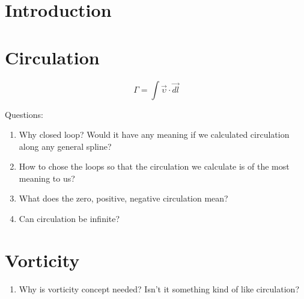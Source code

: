 \documentclass[12pt]{article}
\begin{document}

\setlength{\parindent}{0cm}

\clearpage


\tableofcontents



\setlength{\parskip}{1em}
\renewcommand{\baselinestretch}{1.0}


\newpage


\section{Introduction} \label{chap:intro}



\section{Circulation}

\begin{equation}
\Gamma = \int \vec{\upsilon} \cdot \vec{dl}
\end{equation}

Questions:

\begin{enumerate}
\item Why closed loop? Would it have any meaning if we calculated circulation along any general spline?

\item How to chose the loops so that the circulation we calculate is of the most meaning to us?

\item What does the zero, positive, negative circulation mean?

\item Can circulation be infinite?

\end{enumerate}


\section{Vorticity}


\begin{enumerate}
\item Why is vorticity concept needed? Isn't it something kind of like circulation?

\end{enumerate}




\newpage

\begin{thebibliography}{50}



\end{thebibliography}
\end{document}

